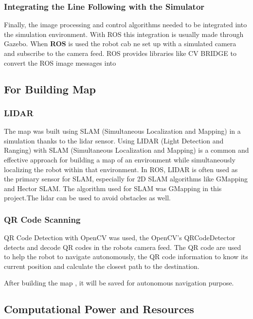 \documentclass[../../main]{subfiles}
\begin{document}
    \subsubsection{Integrating the Line Following with the Simulator}
    
    Finally, the image processing and control algorithms needed to be
    integrated into the simulation environment. With ROS this integration is
    usually made through Gazebo. When \textbf{ROS} is used the robot cab ne
    set up with a simulated camera and subscribe to the camera feed. ROS
    provides libraries like CV BRIDGE to convert the ROS image messages into
    
    \subsection{For Building Map}
    
    \subsubsection{LIDAR}
    
    The map was built using SLAM (Simultaneous Localization and Mapping) in
    a simulation thanks to the lidar sensor. Using LIDAR (Light Detection
    and Ranging) with SLAM (Simultaneous Localization and Mapping) is a
    common and effective approach for building a map of an environment while
    simultaneously localizing the robot within that environment. In ROS,
    LIDAR is often used as the primary sensor for SLAM, especially for 2D
    SLAM algorithms like GMapping and Hector SLAM. The algorithm used for
    SLAM was GMapping in this project.The lidar can be used to avoid
    obstacles as well.
    
    \subsubsection{QR Code Scanning}
    
    QR Code Detection with OpenCV was used, the OpenCV's QRCodeDetector
    detects and decode QR codes in the robot\textquotesingle s camera feed.
    The QR code are used to help the robot to navigate autonomously, the QR
    code information to know its current position and calculate the closest
    path to the destination.
    
    After building the map , it will be saved for autonomous navigation
    purpose.
    
    
  \subsection{Computational Power and Resources}    
\end{document}
